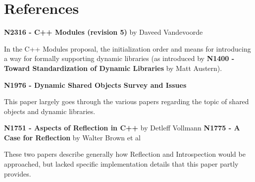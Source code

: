 \section{References}
\textbf{N2316 - C++ Modules (revision 5)} by Daveed Vandevoorde

In the C++ Modules proposal, the initialization order and means for introducing a way for formally supporting dynamic libraries (as introduced by \textbf{N1400 - Toward Standardization of Dynamic Libraries} by Matt Austern).

\textbf{N1976 - Dynamic Shared Objects Survey and Issues}

This paper largely goes through the various papers regarding the topic of shared objects and dynamic libraries.

\textbf{N1751 - Aspects of Reflection in C++} by Detleff Vollmann
\textbf{N1775 - A Case for Reflection} by Walter Brown et al

These two papers describe generally how Reflection and Introspection would be approached, but lacked specific implementation details that this paper partly provides.